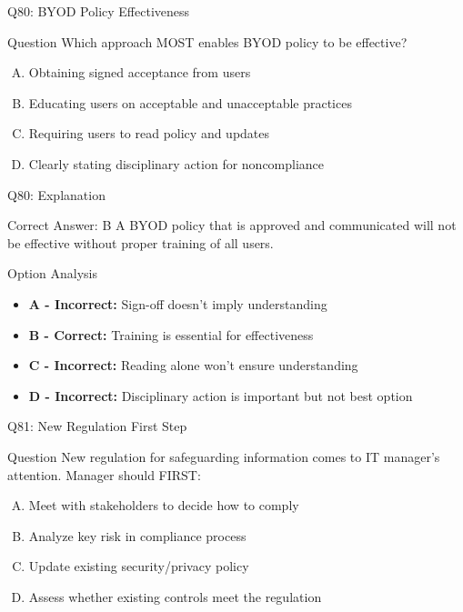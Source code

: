 \documentclass{beamer}
\begin{document}
	\begin{frame}{Q80: BYOD Policy Effectiveness}
		\begin{block}{Question}
			Which approach MOST enables BYOD policy to be effective?
		\end{block}
		\begin{enumerate}[(A)]
			\item Obtaining signed acceptance from users
			\item Educating users on acceptable and unacceptable practices
			\item Requiring users to read policy and updates
			\item Clearly stating disciplinary action for noncompliance
		\end{enumerate}
	\end{frame}
	
	\begin{frame}{Q80: Explanation}
		\begin{block}{Correct Answer: B}
			A BYOD policy that is approved and communicated will not be effective without proper training of all users.
		\end{block}
		\begin{block}{Option Analysis}
			\begin{itemize}
				\item \textbf{A - Incorrect:} Sign-off doesn't imply understanding
				\item \textbf{B - Correct:} Training is essential for effectiveness
				\item \textbf{C - Incorrect:} Reading alone won't ensure understanding
				\item \textbf{D - Incorrect:} Disciplinary action is important but not best option
			\end{itemize}
		\end{block}
	\end{frame}
	
	\begin{frame}{Q81: New Regulation First Step}
		\begin{block}{Question}
			New regulation for safeguarding information comes to IT manager's attention. Manager should FIRST:
		\end{block}
		\begin{enumerate}[(A)]
			\item Meet with stakeholders to decide how to comply
			\item Analyze key risk in compliance process
			\item Update existing security/privacy policy
			\item Assess whether existing controls meet the regulation
		\end{enumerate}
	\end{frame}
	
\end{document}
